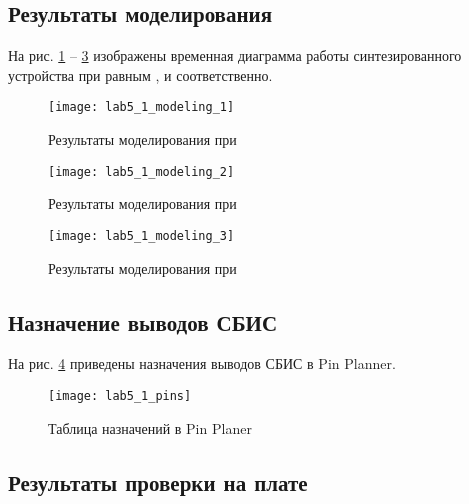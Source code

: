 \subsection{Результаты моделирования}
\label{sec:lab5_1_modeling}

На рис. \ref{fig:lab5_1_modeling_1} -- \ref{fig:lab5_1_modeling_3} изображены временная диаграмма работы синтезированного устройства при  равным \code{&}, \code{|} и \code{^} соответственно.
\vspace{-0.2cm}
\begin{figure}[H]
\begin{center}
	\texttt{[image: lab5\_1\_modeling\_1]}
	\caption{Результаты моделирования при }
	\label{fig:lab5_1_modeling_1}
\end{center}
\end{figure}
\vspace{-0.5cm}
\begin{figure}[H]
\begin{center}
	\texttt{[image: lab5\_1\_modeling\_2]}
	\caption{Результаты моделирования при }
	\label{fig:lab5_1_modeling_2}
\end{center}
\end{figure}
\begin{figure}[H]
\begin{center}
	\texttt{[image: lab5\_1\_modeling\_3]}
	\caption{Результаты моделирования при }
	\label{fig:lab5_1_modeling_3}
\end{center}
\end{figure}

\subsection{Назначение выводов СБИС}

На рис. \ref{fig:lab5_1_pins} приведены назначения выводов СБИС в Pin Planner.

\begin{figure}[H]
\begin{center}
	\texttt{[image: lab5\_1\_pins]}
	\caption{Таблица назначений в Pin Planer}
	\label{fig:lab5_1_pins}
\end{center}
\end{figure}

\subsection{Результаты проверки на плате}

